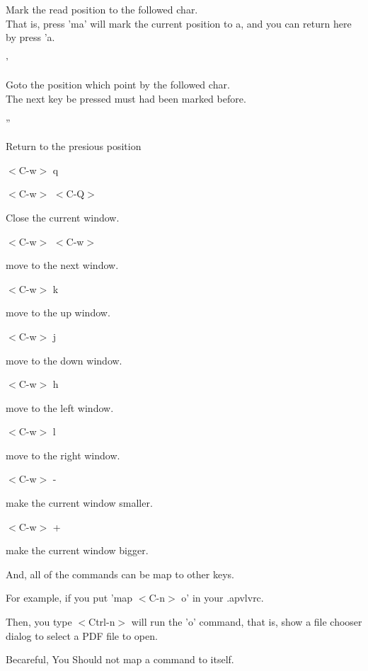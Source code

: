 \documentclass[a4paper,12pt]{article}
\begin{document}
\begin{description}
Mark the read position to the followed char. \\
That is, press 'ma' will mark the current position to a, and you can return here by press 'a.

\item '

Goto the position which point by the followed char. \\
The next key be pressed must had been marked before. 

\item ''

Return to the presious position

\item $<$C-w$>$ q
\item $<$C-w$>$ $<$C-Q$>$

Close the current window.

\item $<$C-w$>$ $<$C-w$>$

move to the next window.

\item $<$C-w$>$ k

move to the up window.

\item $<$C-w$>$ j

move to the down window.

\item $<$C-w$>$ h

move to the left window.

\item $<$C-w$>$ l

move to the right window.

\item $<$C-w$>$ -

make the current window smaller.

\item $<$C-w$>$ +

make the current window bigger.

\end{description}

And, all of the commands can be map to other keys.

For example, if you put 
'map $<$C-n$>$ o'
in your .apvlvrc.

Then, you type $<$Ctrl-n$>$ will run the 'o' command, that is, show a file chooser dialog to select a PDF file to open.

Becareful, You Should not map a command to itself.
\end{document}
